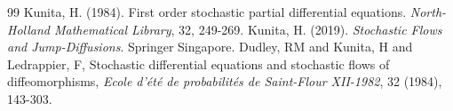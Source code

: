 \documentclass[10pt,a4paper]{amsart}
\numberwithin{equation}{section}
\begin{document}
\begin{thebibliography}{99}
 Kunita, H. (1984). First order stochastic partial differential equations. {\it North-Holland Mathematical Library}, 32, 249-269.
 Kunita, H. (2019). {\it Stochastic Flows and Jump-Diffusions}. Springer Singapore.
 Dudley, RM and Kunita, H and Ledrappier, F, Stochastic differential equations and stochastic flows of diffeomorphisms, {\it Ecole d'{\'e}t{\'e} de probabilit{\'e}s de Saint-Flour XII-1982}, 32 (1984), 143-303.
\end{thebibliography}
\end{document}
